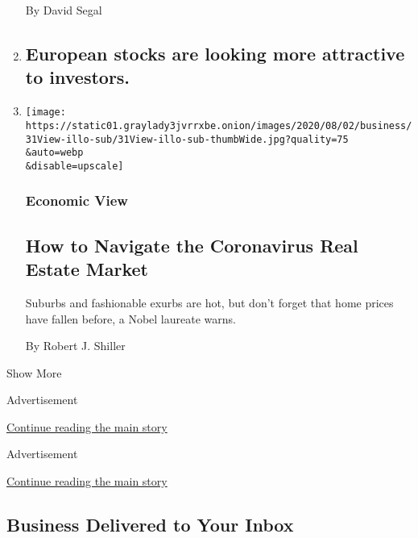 \begin{enumerate}
  By David Segal
\item
  \href{/2020/07/31/business/european-stocks-are-looking-more-attractive-to-investors.html}{}

  \hypertarget{european-stocks-are-looking-more-attractive-to-investors}{%
  \subsection{European stocks are looking more attractive to
  investors.}\label{european-stocks-are-looking-more-attractive-to-investors}}
\item
  \href{/2020/07/31/business/housing-market-prices-risk.html}{}

  \texttt{[image: https://static01.graylady3jvrrxbe.onion/images/2020/08/02/business/31View-illo-sub/31View-illo-sub-thumbWide.jpg?quality=75\\\&auto=webp\\\&disable=upscale]}

  \hypertarget{economic-view}{%
  \subsubsection{Economic View}\label{economic-view}}

  \hypertarget{how-to-navigate-the-coronavirus-real-estate-market}{%
  \subsection{How to Navigate the Coronavirus Real Estate
  Market}\label{how-to-navigate-the-coronavirus-real-estate-market}}

  Suburbs and fashionable exurbs are hot, but don't forget that home
  prices have fallen before, a Nobel laureate warns.

  By Robert J. Shiller
\end{enumerate}

Show More

Advertisement

\protect\hyperlink{after-mid2}{Continue reading the main story}

Advertisement

\protect\hyperlink{after-mktg}{Continue reading the main story}

\hypertarget{business-delivered-to-your-inbox}{%
\subsection{Business Delivered to Your
Inbox}\label{business-delivered-to-your-inbox}}

